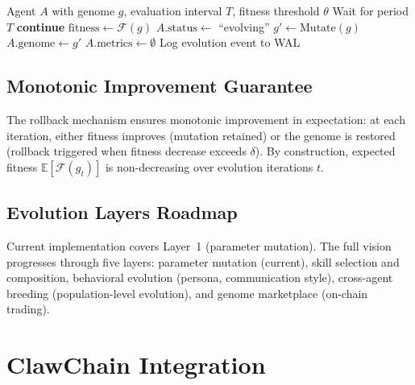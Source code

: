\documentclass[conference]{IEEEtran}
\newcommand{\fitnessfn}{\mathcal{F}}
\begin{document}
\begin{algorithm}[t]
\caption{Evolution Loop}
\label{alg:evolution}
\begin{algorithmic}[1]
\Require Agent $A$ with genome $g$, evaluation interval $T$, fitness threshold $\theta$
\Loop
    \State Wait for period $T$
        \State \textbf{continue} 
    \EndIf
    \State $\text{fitness} \gets \fitnessfn(g)$
        \State $A.\text{status} \gets$ ``evolving''
        \State $g' \gets \text{Mutate}(g)$
        \State $A.\text{genome} \gets g'$
        \State $A.\text{metrics} \gets \emptyset$ 
        \State Log evolution event to WAL
    \EndIf
\EndLoop
\end{algorithmic}
\end{algorithm}

\subsection{Monotonic Improvement Guarantee}

The rollback mechanism ensures monotonic improvement in expectation: at each iteration, either fitness improves (mutation retained) or the genome is restored (rollback triggered when fitness decrease exceeds $\delta$). By construction, expected fitness $\mathbb{E}[\fitnessfn(g_t)]$ is non-decreasing over evolution iterations $t$.

\subsection{Evolution Layers Roadmap}

Current implementation covers Layer~1 (parameter mutation). The full vision progresses through five layers: parameter mutation (current), skill selection and composition, behavioral evolution (persona, communication style), cross-agent breeding (population-level evolution), and genome marketplace (on-chain trading).



\section{ClawChain Integration}
\label{sec:clawchain}
\end{document}
